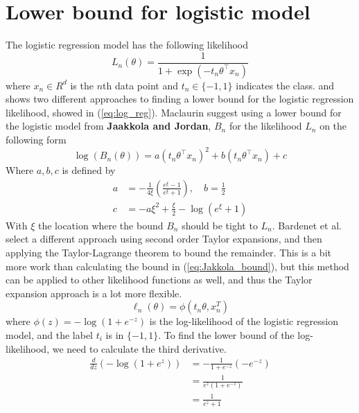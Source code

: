 \documentclass{article}
\theoremstyle{definition}
\begin{document}
\section{Lower bound for logistic model}
The logistic regression model has the following likelihood 
\begin{equation}\label{eq:log_reg}
    L_n\left(\theta\right) = \frac{1}{1 + \exp\left(-t_n\theta^{\top} x_n\right)} 
\end{equation}
where $x_n \in R^d$ is the $n$th data point and $t_n\in \{-1, 1\}$ indicates the class. 
\cite{Maclaurin:1} and \cite{Bardenet:1} shows two different approaches to finding a lower bound for the logistic regression likelihood, showed in (\ref{eq:log_reg}). 
Maclaurin suggest using a lower bound for the logistic model from \textbf{Jaakkola and Jordan},  $B_n$ for the likelihood $L_n$ on the following form 
\begin{equation}\label{eq:Jakkola_bound}
    \log\left(B_n\left(\theta\right)\right) = a\left(t_n\theta^{\top}x_n\right)^2 + b\left(t_n\theta^{\top} x_n\right) + c
\end{equation}
Where $a,b,c$ is defined by
\begin{equation}
\begin{split}
    a &= -\frac{1}{4\xi}\left(\frac{e^{\xi} - 1}{e^{\xi} + 1}\right), \quad b = \frac{1}{2} \\
    c &= -a\xi^2 + \frac{\xi}{2} - \log\left(e^{\xi} + 1\right)
\end{split}
\end{equation}
With $\xi$ the location where the bound $B_n$ should be tight to $L_n$. 
Bardenet et al. select a different approach using second order Taylor expansions, and then applying the Taylor-Lagrange theorem to bound the remainder. 
This is a bit more work than calculating the bound in  (\ref{eq:Jakkola_bound}), but this method can be applied to other likelihood functions as well, and thus the Taylor expansion approach is a lot more flexible. 
\begin{equation*}
\ell_n(\theta) = \phi\left(t_n\theta, x_n^T\right)
\end{equation*}
where $\phi(z) = -\log\left( 1  + e^{-z}\right)$ is the log-likelihood of the logistic regression model, and the label $t_i$ is in $\{-1, 1\}$. To find the lower bound of the log-likelihood, we need to calculate the third derivative. 
\begin{equation*}
\begin{split}
\frac{d}{dz} \left( - \log\left(1 + e^z\right)\right) &= - \frac{1}{1 + e^{-z}} \left(-e^{-z}\right) \\
& = \frac{1}{e^z \left(1+e^{-z}\right)} \\
& = \frac{1}{e^z + 1}
\end{split}
\end{equation*}
\end{document}
